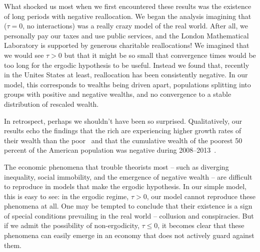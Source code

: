 What shocked us most when we first encountered these results was the existence of long periods with negative reallocation. We began the analysis imagining that \GBM (\ie $\tau=0$, no interactions) was a really crazy model of the real world. After all, we personally pay our taxes and use public services, and the London Mathematical Laboratory is supported by generous charitable reallocations! We imagined that we would see $\tau>0$ but that it might be so small that convergence times would be too long for the ergodic hypothesis to be useful. Instead we found that, recently in the Unites States at least, reallocation has been consistently negative. In our model, this corresponds to wealths being driven apart, populations splitting into groups with positive and negative wealths, and no convergence to a stable distribution of rescaled wealth.

In retrospect, perhaps we shouldn't have been so surprised. Qualitatively, our results echo the findings that the rich are experiencing higher growth rates of their wealth than the poor~\cite{Piketty2014,wolff2014household} and that the cumulative wealth of the poorest 50 percent of the American population was negative during 2008--2013~\cite{Rios20162013,WID2017}.

The economic phenomena that trouble theorists most -- such as diverging inequality, social immobility, and the emergence of negative wealth -- are difficult to reproduce in models that make the ergodic hypothesis. In our simple model, this is easy to see: in the ergodic regime, $\tau>0$, our model cannot reproduce these phenomena at all. One may be tempted to conclude that their existence is a sign of special conditions prevailing in the real world -- collusion and conspiracies. But if we admit the possibility of non-ergodicity, $\tau\leq0$, it becomes clear that these phenomena can easily emerge in an economy that does not actively guard against them.